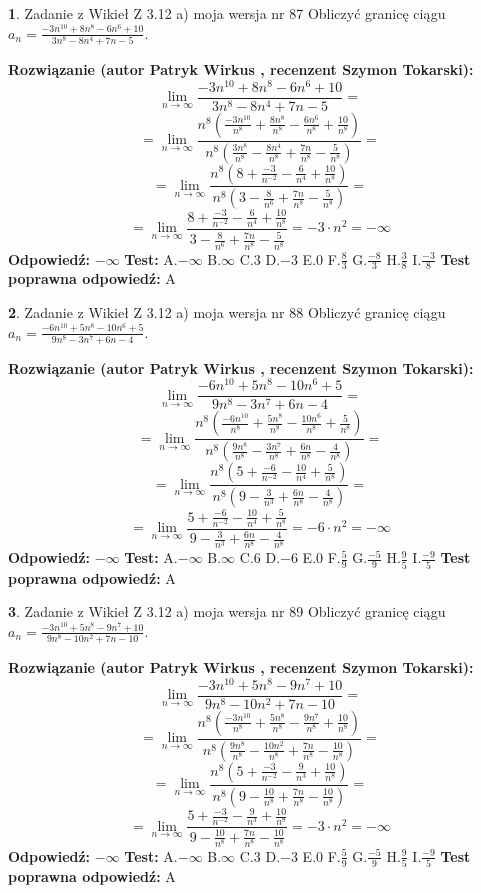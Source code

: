 \documentclass[12pt, a4paper]{article}
\theoremstyle{definition} %
\newtheorem{zad}{}
\newcommand{\zadStart}[1]{\begin{zad}#1\newline}
\newcommand{\zadStop}{\end{zad}}
\newcommand{\rozwStart}[2]{\noindent \textbf{Rozwiązanie (autor #1 , recenzent #2): }\newline}
\newcommand{\rozwStop}{\newline}
\newcommand{\odpStart}{\noindent \textbf{Odpowiedź:}\newline}
\newcommand{\odpStop}{\newline}
\newcommand{\testStart}{\noindent \textbf{Test:}\newline}
\newcommand{\testStop}{\newline}
\newcommand{\kluczStart}{\noindent \textbf{Test poprawna odpowiedź:}\newline}
\newcommand{\kluczStop}{\newline}
\begin{document}
\zadStart{Zadanie z Wikieł Z 3.12 a) moja wersja nr 87}
Obliczyć granicę ciągu $a_{n}=\frac{-3n^{10}+8n^{8}-6n^{6}+10}{3n^{8}-8n^{4}+7n-5}$.
\zadStop
\rozwStart{Patryk Wirkus}{Szymon Tokarski}
$$\lim\limits_{n\to\infty}\frac{-3n^{10}+8n^{8}-6n^{6}+10}{3n^{8}-8n^{4}+7n-5}=$$
$$=\lim\limits_{n\to\infty}\frac{n^{8}\left(\frac{-3n^{10}}{n^{8}}+\frac{8n^{8}}{n^{8}}-\frac{6n^{6}}{n^{8}}+\frac{10}{n^{8}}\right)}{n^{8}\left(\frac{3n^{8}}{n^{8}}-\frac{8n^{4}}{n^{8}}+\frac{7n}{n^{8}}-\frac{5}{n^{8}}\right)}=$$
$$=\lim\limits_{n\to\infty}\frac{n^{8}\left(8+\frac{-3}{n^{-2}}-\frac{6}{n^{4}}+\frac{10}{n^{8}}\right)}
{n^{8}\left(3-\frac{8}{n^{6}}+\frac{7n}{n^{8}}-\frac{5}{n^{8}}\right)}=$$
$$=\lim\limits_{n\to\infty}\frac{8+\frac{-3}{n^{-2}}-\frac{6}{n^{4}}+\frac{10}{n^{8}}}{3-\frac{8}{n^{6}}+\frac{7n}{n^{8}}-\frac{5}{n^{8}}}=-3\cdot n^{2} = -\infty$$
\rozwStop
\odpStart
$-\infty$
\odpStop
\testStart
A.$-\infty$
B.$\infty$
C.$3$
D.$-3$
E.$0$
F.$\frac{8}{3}$
G.$\frac{-8}{3}$
H.$\frac{3}{8}$
I.$\frac{-3}{8}$
\testStop
\kluczStart
A
\kluczStop



\zadStart{Zadanie z Wikieł Z 3.12 a) moja wersja nr 88}
Obliczyć granicę ciągu $a_{n}=\frac{-6n^{10}+5n^{8}-10n^{6}+5}{9n^{8}-3n^{7}+6n-4}$.
\zadStop
\rozwStart{Patryk Wirkus}{Szymon Tokarski}
$$\lim\limits_{n\to\infty}\frac{-6n^{10}+5n^{8}-10n^{6}+5}{9n^{8}-3n^{7}+6n-4}=$$
$$=\lim\limits_{n\to\infty}\frac{n^{8}\left(\frac{-6n^{10}}{n^{8}}+\frac{5n^{8}}{n^{8}}-\frac{10n^{6}}{n^{8}}+\frac{5}{n^{8}}\right)}{n^{8}\left(\frac{9n^{8}}{n^{8}}-\frac{3n^{7}}{n^{8}}+\frac{6n}{n^{8}}-\frac{4}{n^{8}}\right)}=$$
$$=\lim\limits_{n\to\infty}\frac{n^{8}\left(5+\frac{-6}{n^{-2}}-\frac{10}{n^{4}}+\frac{5}{n^{8}}\right)}
{n^{8}\left(9-\frac{3}{n^{3}}+\frac{6n}{n^{8}}-\frac{4}{n^{8}}\right)}=$$
$$=\lim\limits_{n\to\infty}\frac{5+\frac{-6}{n^{-2}}-\frac{10}{n^{4}}+\frac{5}{n^{8}}}{9-\frac{3}{n^{3}}+\frac{6n}{n^{8}}-\frac{4}{n^{8}}}=-6\cdot n^{2} = -\infty$$
\rozwStop
\odpStart
$-\infty$
\odpStop
\testStart
A.$-\infty$
B.$\infty$
C.$6$
D.$-6$
E.$0$
F.$\frac{5}{9}$
G.$\frac{-5}{9}$
H.$\frac{9}{5}$
I.$\frac{-9}{5}$
\testStop
\kluczStart
A
\kluczStop



\zadStart{Zadanie z Wikieł Z 3.12 a) moja wersja nr 89}
Obliczyć granicę ciągu $a_{n}=\frac{-3n^{10}+5n^{8}-9n^{7}+10}{9n^{8}-10n^{2}+7n-10}$.
\zadStop
\rozwStart{Patryk Wirkus}{Szymon Tokarski}
$$\lim\limits_{n\to\infty}\frac{-3n^{10}+5n^{8}-9n^{7}+10}{9n^{8}-10n^{2}+7n-10}=$$
$$=\lim\limits_{n\to\infty}\frac{n^{8}\left(\frac{-3n^{10}}{n^{8}}+\frac{5n^{8}}{n^{8}}-\frac{9n^{7}}{n^{8}}+\frac{10}{n^{8}}\right)}{n^{8}\left(\frac{9n^{8}}{n^{8}}-\frac{10n^{2}}{n^{8}}+\frac{7n}{n^{8}}-\frac{10}{n^{8}}\right)}=$$
$$=\lim\limits_{n\to\infty}\frac{n^{8}\left(5+\frac{-3}{n^{-2}}-\frac{9}{n^{3}}+\frac{10}{n^{8}}\right)}
{n^{8}\left(9-\frac{10}{n^{8}}+\frac{7n}{n^{8}}-\frac{10}{n^{8}}\right)}=$$
$$=\lim\limits_{n\to\infty}\frac{5+\frac{-3}{n^{-2}}-\frac{9}{n^{3}}+\frac{10}{n^{8}}}{9-\frac{10}{n^{8}}+\frac{7n}{n^{8}}-\frac{10}{n^{8}}}=-3\cdot n^{2} = -\infty$$
\rozwStop
\odpStart
$-\infty$
\odpStop
\testStart
A.$-\infty$
B.$\infty$
C.$3$
D.$-3$
E.$0$
F.$\frac{5}{9}$
G.$\frac{-5}{9}$
H.$\frac{9}{5}$
I.$\frac{-9}{5}$
\testStop
\kluczStart
A
\kluczStop
\end{document}
